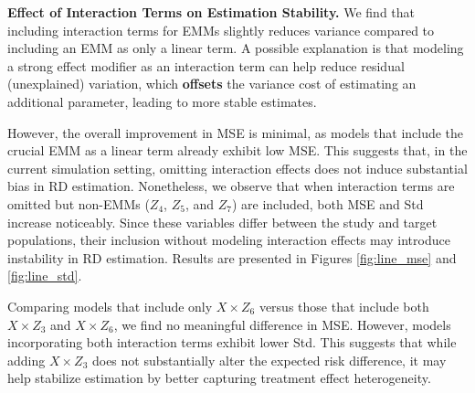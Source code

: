 \documentclass[12pt,oneside]{amsart}
\theoremstyle{definition}
\theoremstyle{remark}
\numberwithin{equation}{section}
\begin{document}
\textbf{Effect of Interaction Terms on Estimation Stability.} 
We find that including interaction terms for EMMs slightly reduces variance compared to including an EMM as only a linear term. A possible explanation is that modeling a strong effect modifier as an interaction term can help reduce residual (unexplained) variation, which \textbf{offsets} the variance cost of estimating an additional parameter, leading to more stable estimates.

However, the overall improvement in MSE is minimal, as models that include the crucial EMM as a linear term already exhibit low MSE. This suggests that, in the current simulation setting, omitting interaction effects does not induce substantial bias in RD estimation. Nonetheless, we observe that when interaction terms are omitted but non-EMMs (\( Z_4 \), \( Z_5 \), and \( Z_7 \)) are included, both MSE and Std increase noticeably. Since these variables differ between the study and target populations, their inclusion without modeling interaction effects may introduce instability in RD estimation. Results are presented in Figures \ref{fig:line_mse} and \ref{fig:line_std}. 

Comparing models that include only \( X \times Z_6 \) versus those that include both \( X \times Z_3 \) and \( X \times Z_6 \), we find no meaningful difference in MSE. However, models incorporating both interaction terms exhibit lower Std. This suggests that while adding \( X \times Z_3 \) does not substantially alter the expected risk difference, it may help stabilize estimation by better capturing treatment effect heterogeneity.

 
\end{document}
